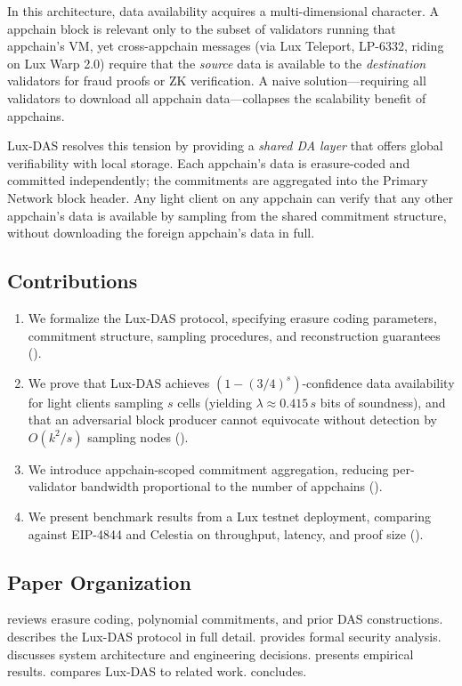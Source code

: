 In this architecture, data availability acquires a multi-dimensional character. A appchain block
is relevant only to the subset of validators running that appchain's VM, yet cross-appchain
messages (via Lux Teleport, LP-6332, riding on Lux Warp 2.0) require that the \emph{source} data is available to the
\emph{destination} validators for fraud proofs or ZK verification. A naive solution---requiring
all validators to download all appchain data---collapses the scalability benefit of appchains.

Lux-DAS resolves this tension by providing a \emph{shared DA layer} that offers global
verifiability with local storage. Each appchain's data is erasure-coded and committed
independently; the commitments are aggregated into the Primary Network block header. Any
light client on any appchain can verify that any other appchain's data is available by sampling
from the shared commitment structure, without downloading the foreign appchain's data in full.

\subsection{Contributions}

\begin{enumerate}[leftmargin=*]
    \item We formalize the Lux-DAS protocol, specifying erasure coding parameters, commitment
          structure, sampling procedures, and reconstruction guarantees ().
    \item We prove that Lux-DAS achieves $(1 - (3/4)^s)$-confidence data availability for
          light clients sampling $s$ cells (yielding $\lambda \approx 0.415\,s$ bits of soundness), and that an adversarial block producer
          cannot equivocate without detection by $O(k^2 / s)$ sampling nodes ().
    \item We introduce appchain-scoped commitment aggregation, reducing per-validator bandwidth
          proportional to the number of appchains ().
    \item We present benchmark results from a Lux testnet deployment, comparing against
          EIP-4844 and Celestia on throughput, latency, and proof size ().
\end{enumerate}

\subsection{Paper Organization}

 reviews erasure coding, polynomial commitments, and prior DAS
constructions.  describes the Lux-DAS protocol in full detail.
 provides formal security analysis.  discusses
system architecture and engineering decisions.  presents empirical
results.  compares Lux-DAS to related work.  concludes.


